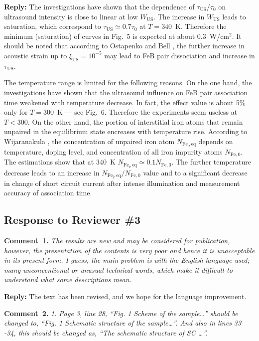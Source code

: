 \documentclass[sn-mathphys]{sn-jnl}
\begin{document}
\noindent
\textcolor[rgb]{0.51,0.00,0.00}{\textbf{Reply:}}
The investigations have shown that the dependence of $\tau_\mathrm{US}/\tau_{0}$
on ultrasound intensity is close to linear at low $W_\mathrm{US}$.
The increase in $W_\mathrm{US}$ leads to saturation, which correspond to
$\tau_\mathrm{US}\simeq0.7\tau_{0}$ at $T=340$~K.
Therefore the minimum (saturation) of curves in Fig.~5 is expected at about $0.3$~W/cm$^2$.
It should be noted that according to Ostapenko and Bell \cite{Ostapenko1995},
the further increase in acoustic strain up to $\xi_\mathrm{US}=10^{-5}$ may lead to
FeB pair dissociation and increase in $\tau_\mathrm{US}$.

The temperature range is limited for the following reasons.
On the one hand, the investigations have shown that the ultrasound influence
on FeB pair association time weakened with temperature decrease.
 In fact, the effect value is about 5\% only for $T=300$~K --- see Fig.~6.
Therefore the experiments seem useless at $T<300$.
On the other hand, the portion of interstitial iron atoms that
remain unpaired in the equilibrium state encreases with temperature rise.
According to Wijaranakula \cite{FeB:kinetic}, the concentration of
unpaired iron atom $N_\mathrm{Fe_i,eq}$
depends on temperature, doping level, and concentration of
all iron impurity atoms $N_\mathrm{Fe,0}$.
The estimations show that at 340~K $N_\mathrm{Fe_i,eq}\simeq0.1N_\mathrm{Fe,0}$.
The further temperature decrease leads to an increase in
$N_\mathrm{Fe_i,eq}/N_\mathrm{Fe,0}$ value and
to a significant decrease in change of short circuit current after intense illumination
and measurement accuracy of association time.



\subsection*{Response to Reviewer \#3 }
\noindent
\textcolor[rgb]{0.00,0.50,1.00}{\textbf{Comment~1.}}
\emph{The results are new and may be considered for publication, however, the presentation of the contents is very poor and hence it is unacceptable in its present form.
I guess, the main problem is with the English language used;  many unconventional or unusual technical words, which make it difficult to understand what some descriptions mean. }

\noindent
\textcolor[rgb]{0.51,0.00,0.00}{\textbf{Reply:}}
The text has been revised, and we hope for the language improvement.


\vspace{1cm}
\noindent
\textcolor[rgb]{0.00,0.50,1.00}{\textbf{Comment~2.}}
\emph{1.	Page 3, line 28, “Fig. 1 Scheme of the sample…” should be changed to, “Fig. 1 Schematic structure of the sample…”. And also in lines 33 -34, this should be changed as, “The schematic structure of SC …”.}
\end{document}
